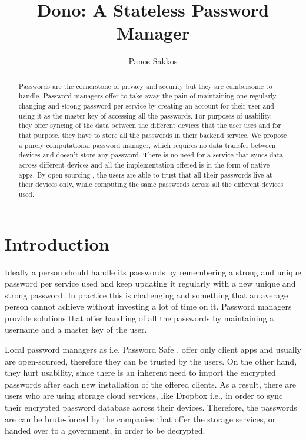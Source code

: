 \documentclass{sig-alternate}
\begin{document}
\title{Dono: A Stateless Password Manager}

\author{
\alignauthor
Panos Sakkos\\
}

\maketitle

\begin{abstract}
Passwords are the cornerstone of privacy and security but they are cumbersome to handle.
Password managers offer to take away the pain of maintaining one regularly changing
and strong password per service by creating an account for their user and using it
as the master key of accessing all the passwords. For purposes of usability, they
offer syncing of the data between the different devices that the user uses and for
that purpose, they have to store all the passwords in their backend service. We
propose a purely computational password manager, which requires no data transfer
between devices and doesn't store any password. There is no need for a service that
syncs data across different devices and all the implementation offered is in the
form of native apps. By open-sourcing \ours, the users are able to trust that all
their passwords live at their devices only, while computing the same passwords
across all the different devices used.

\end{abstract}

\section{Introduction}\label{section:introduction}

Ideally a person should handle its passwords by remembering a strong and unique password
per service used and keep updating it regularly with a new unique and strong password.
In practice this is challenging and something that an average person cannot achieve
without investing a lot of time on it. Password managers provide solutions that
offer handling of all the passwords by maintaining a username and a master key of the user.

Local password managers as i.e. Password Safe \cite{passsafe:2015}, offer only client
apps and usually are open-sourced, therefore they can be trusted by the users.
On the other hand, they hurt usability, since there is an inherent need to import
the encrypted passwords after each new installation of the offered clients. As a
result, there are users who are using storage cloud services, like Dropbox i.e., in
order to sync their encrypted password database across their devices. Therefore, the
passwords are can be brute-forced by the companies that offer the storage services, or handed over to a government, in order to be decrypted.
\end{document}
